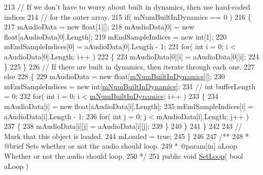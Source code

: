 \begin{DoxyCodeInclude}
213         \textcolor{comment}{// If we don't have to worry about built in dynamics, then use hard-coded indices }
214         \textcolor{comment}{// for the outer array.}
215         \textcolor{keywordflow}{if}( mNumBuiltInDynamics == 0 )
216         \{
217             mAudioData = \textcolor{keyword}{new} \textcolor{keywordtype}{float}[1][];
218             mAudioData[0] = \textcolor{keyword}{new} \textcolor{keywordtype}{float}[aAudioData[0].Length];
219             mEndSampleIndices = \textcolor{keyword}{new} \textcolor{keywordtype}{int}[1];
220             mEndSampleIndices[0] = aAudioData[0].Length - 1;
221             \textcolor{keywordflow}{for}( \textcolor{keywordtype}{int} i = 0; i < aAudioData[0].Length; i++ )
222             \{
223                 mAudioData[0][i] = aAudioData[0][i];
224             \}
225         \}
226         \textcolor{comment}{// If there are built in dynamics, then iterate through each one.}
227         \textcolor{keywordflow}{else}
228         \{
229             mAudioData = \textcolor{keyword}{new} \textcolor{keywordtype}{float}[\hyperlink{group___n_o_o_priv_var_ga3cc04564fcc1b1c4597af18e7e4fbc47}{mNumBuiltInDynamics}][];
230             mEndSampleIndices = \textcolor{keyword}{new} \textcolor{keywordtype}{int}[\hyperlink{group___n_o_o_priv_var_ga3cc04564fcc1b1c4597af18e7e4fbc47}{mNumBuiltInDynamics}];
231             \textcolor{comment}{// int bufferLength = 0;}
232             \textcolor{keywordflow}{for}( \textcolor{keywordtype}{int} i = 0; i < \hyperlink{group___n_o_o_priv_var_ga3cc04564fcc1b1c4597af18e7e4fbc47}{mNumBuiltInDynamics}; i++ )
233             \{
234                 mAudioData[i] = \textcolor{keyword}{new} \textcolor{keywordtype}{float}[aAudioData[i].Length];
235                 mEndSampleIndices[i] = aAudioData[i].Length - 1;
236                 \textcolor{keywordflow}{for}( \textcolor{keywordtype}{int} j = 0; j < mAudioData[i].Length; j++ )
237                 \{
238                     mAudioData[i][j] = aAudioData[i][j];
239                 \}
240             \}
241         \}
242 
243         \textcolor{comment}{// Mark that this object is loaded. }
244         mLoaded = \textcolor{keyword}{true};
245     \}
246 \textcolor{comment}{}
247 \textcolor{comment}{    /**}
248 \textcolor{comment}{     * @brief Sets whether or not the audio should loop.}
249 \textcolor{comment}{     * @param[in] aLoop Whether or not the audio should loop.}
250 \textcolor{comment}{    */}
251     \textcolor{keyword}{public} \textcolor{keywordtype}{void} \hyperlink{group___n_o_o_pub_func_ga7b79bbd2c7a68831b322edff140f29d2}{SetLoop}( \textcolor{keywordtype}{bool} aLoop )

\end{DoxyCodeInclude}
